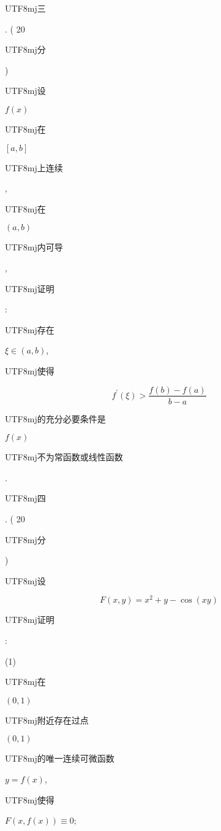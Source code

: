\documentclass[10pt]{article}
\begin{document}
\begin{CJK}{UTF8}{mj}三\end{CJK}. ( 20 \begin{CJK}{UTF8}{mj}分\end{CJK}) \begin{CJK}{UTF8}{mj}设\end{CJK} $f(x)$ \begin{CJK}{UTF8}{mj}在\end{CJK} $[a, b]$ \begin{CJK}{UTF8}{mj}上连续\end{CJK}, \begin{CJK}{UTF8}{mj}在\end{CJK} $(a, b)$ \begin{CJK}{UTF8}{mj}内可导\end{CJK}, \begin{CJK}{UTF8}{mj}证明\end{CJK}: \begin{CJK}{UTF8}{mj}存在\end{CJK} $\xi \in(a, b)$, \begin{CJK}{UTF8}{mj}使得\end{CJK}
$$
f^{\prime}(\xi)>\frac{f(b)-f(a)}{b-a}
$$
\begin{CJK}{UTF8}{mj}的充分必要条件是\end{CJK} $f(x)$ \begin{CJK}{UTF8}{mj}不为常函数或线性函数\end{CJK}.

\begin{CJK}{UTF8}{mj}四\end{CJK}. ( 20 \begin{CJK}{UTF8}{mj}分\end{CJK}) \begin{CJK}{UTF8}{mj}设\end{CJK}
$$
F(x, y)=x^{2}+y-\cos (x y)
$$
\begin{CJK}{UTF8}{mj}证明\end{CJK}:

(1) \begin{CJK}{UTF8}{mj}在\end{CJK} $(0,1)$ \begin{CJK}{UTF8}{mj}附近存在过点\end{CJK} $(0,1)$ \begin{CJK}{UTF8}{mj}的唯一连续可微函数\end{CJK} $y=f(x)$, \begin{CJK}{UTF8}{mj}使得\end{CJK} $F(x, f(x)) \equiv 0$;
\end{document}
